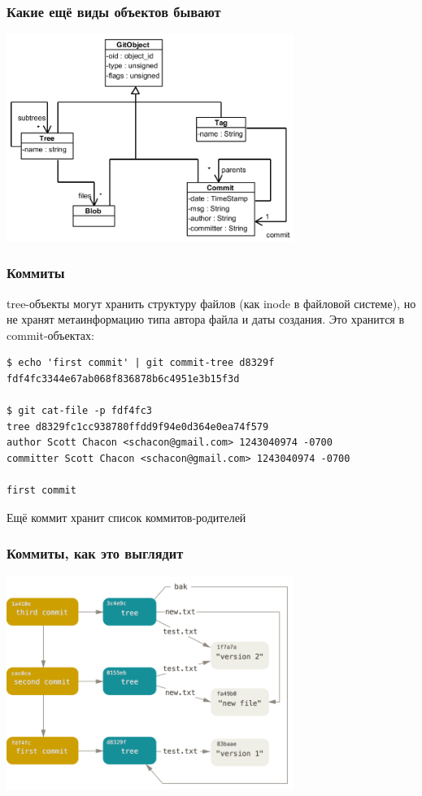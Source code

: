 \documentclass[xetex,mathserif,serif]{beamer}
\begin{document}
    \begin{frame}
        \frametitle{Какие ещё виды объектов бывают}
        \begin{center}
            \includegraphics[width=0.7\textwidth]{gitDataStructure.png}
        \end{center}
    \end{frame}

    \begin{frame}[fragile]
        \frametitle{Коммиты}
        tree-объекты могут хранить структуру файлов (как inode в файловой системе), но не хранят метаинформацию типа автора файла и даты создания. Это хранится в commit-объектах:
        \begin{verbatim}
$ echo 'first commit' | git commit-tree d8329f
fdf4fc3344e67ab068f836878b6c4951e3b15f3d

$ git cat-file -p fdf4fc3
tree d8329fc1cc938780ffdd9f94e0d364e0ea74f579
author Scott Chacon <schacon@gmail.com> 1243040974 -0700
committer Scott Chacon <schacon@gmail.com> 1243040974 -0700

first commit
        \end{verbatim}
        Ещё коммит хранит список коммитов-родителей
    \end{frame}

    \begin{frame}
        \frametitle{Коммиты, как это выглядит}
        \begin{center}
            \includegraphics[width=0.7\textwidth]{gitCommitObjects.png}
        \end{center}
    \end{frame}
\end{document}
